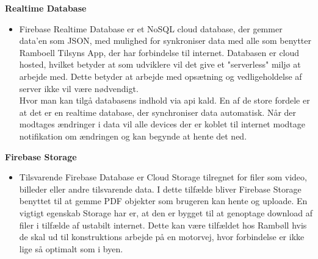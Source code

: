 \textbf{Realtime Database\cite{FirebaseRealtimeDB}}
\begin{itemize}[-]
	\itemsep 0.3em 
	\item[]  Firebase Realtime Database er et NoSQL cloud database, der gemmer data'en som JSON\cite{JSON}, med mulighed for synkroniser data med alle som benytter Ramboell Tilsyns App, der har forbindelse til internet. Databasen er cloud hosted, hvilket betyder at som udviklere vil det give et "serverless" miljø at arbejde med. Dette betyder at arbejde med opsætning og vedligeholdelse af server ikke vil være nødvendigt. \\ Hvor man kan tilgå databasens indhold via api kald. 
	En af de store fordele er at det er en realtime database, der synchroniser data automatisk. Når der modtages ændringer i data vil alle devices der er koblet til internet modtage notifikation om ændringen og kan begynde at hente det ned. 
\end{itemize}

\clearpage

\textbf{Firebase Storage\cite{FirebaseStorage}}
\begin{itemize}[-]
	\itemsep 0.3em 
	\item[] Tilsvarende Firebase Database er Cloud Storage tilregnet for filer som video, billeder eller andre tilsvarende data. I dette tilfælde bliver Firebase Storage benyttet til at gemme PDF objekter som brugeren kan hente og uploade. En vigtigt egenskab Storage har er, at den er bygget til at genoptage download af filer i tilfælde af ustabilt internet. Dette kan være tilfældet hos Rambøll hvis de skal ud til konstruktions arbejde på en motorvej, hvor forbindelse er ikke lige så optimalt som i byen. \\
\end{itemize}
\clearpage

